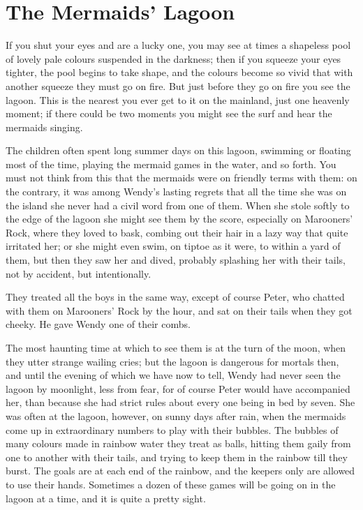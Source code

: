 
\chapter{The Mermaids’ Lagoon}

If you shut your eyes and are a lucky one,
you may see at times a shapeless pool of lovely pale colours suspended in the darkness;
then if you squeeze your eyes tighter, the pool begins to take shape,
and the colours become so vivid that with another squeeze they must go on fire.
But just before they go on fire you see the lagoon.
This is the nearest you ever get to it on the mainland, just one heavenly moment;
if there could be two moments you might see the surf and hear the mermaids singing.

The children often spent long summer days on this lagoon,
swimming or floating most of the time, playing the mermaid games in the water, and so forth.
You must not think from this that the mermaids were on friendly terms with them:
on the contrary, it was among Wendy’s lasting regrets
that all the time she was on the island she never had a civil word from one of them.
When she stole softly to the edge of the lagoon she might see them by the score,
especially on Marooners’ Rock, where they loved to bask,
combing out their hair in a lazy way that quite irritated her;
or she might even swim, on tiptoe as it were, to within a yard of them,
but then they saw her and dived, probably splashing her with their tails,
not by accident, but intentionally.

They treated all the boys in the same way, except of course Peter,
who chatted with them on Marooners’ Rock by the hour,
and sat on their tails when they got cheeky.
He gave Wendy one of their combs.

The most haunting time at which to see them is at the turn of the moon,
when they utter strange wailing cries;
but the lagoon is dangerous for mortals then,
and until the evening of which we have now to tell, Wendy had never seen the lagoon by moonlight,
less from fear, for of course Peter would have accompanied her,
than because she had strict rules about every one being in bed by seven.
She was often at the lagoon, however, on sunny days after rain,
when the mermaids come up in extraordinary numbers to play with their bubbles.
The bubbles of many colours made in rainbow water they treat as balls,
hitting them gaily from one to another with their tails, and trying to keep them in the rainbow till they burst.
The goals are at each end of the rainbow, and the keepers only are allowed to use their hands.
Sometimes a dozen of these games will be going on in the lagoon at a time, and it is quite a pretty sight.

